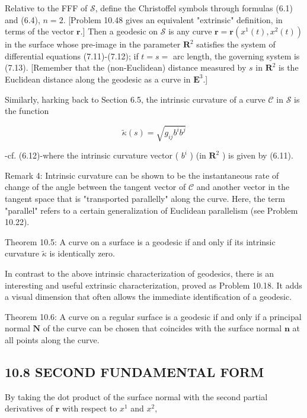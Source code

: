 \documentclass[10pt]{article}
\begin{document}
Relative to the FFF of $\mathscr{S}$, define the Christoffel symbols through formulas (6.1) and (6.4), $n=2$. [Problem 10.48 gives an equivalent "extrinsic" definition, in terms of the vector $\mathbf{r}$.] Then a geodesic on $\mathscr{S}$ is any curve $\mathbf{r}=\mathbf{r}\left(x^{1}(t), x^{2}(t)\right)$ in the surface whose pre-image in the parameter $\mathbf{R}^{2}$ satisfies the system of differential equations (7.11)-(7.12); if $t=s=$ arc length, the governing system is (7.13). [Remember that the (non-Euclidean) distance measured by $s$ in $\mathbf{R}^{2}$ is the Euclidean distance along the geodesic as a curve in $\mathbf{E}^{3}$.]

Similarly, harking back to Section 6.5, the intrinsic curvature of a curve $\mathscr{C}$ in $\mathscr{S}$ is the function


\begin{equation*}
\tilde{\kappa}(s)=\sqrt{g_{i j} b^{i} b^{j}} \tag{10.20}
\end{equation*}


-cf. (6.12)-where the intrinsic curvature vector ( $b^{i}$ ) (in $\mathbf{R}^{2}$ ) is given by (6.11).

Remark 4: Intrinsic curvature can be shown to be the instantaneous rate of change of the angle between the tangent vector of $\mathscr{C}$ and another vector in the tangent space that is "transported parallelly" along the curve. Here, the term "parallel" refers to a certain generalization of Euclidean parallelism (see Problem 10.22).

Theorem 10.5: A curve on a surface is a geodesic if and only if its intrinsic curvature $\tilde{\kappa}$ is identically zero.

In contrast to the above intrinsic characterization of geodesics, there is an interesting and useful extrinsic characterization, proved as Problem 10.18. It adds a visual dimension that often allows the immediate identification of a geodesic.

Theorem 10.6: A curve on a regular surface is a geodesic if and only if a principal normal $\mathbf{N}$ of the curve can be chosen that coincides with the surface normal $\mathbf{n}$ at all points along the curve.

\subsection*{10.8 SECOND FUNDAMENTAL FORM}
By taking the dot product of the surface normal with the second partial derivatives of $\mathbf{r}$ with respect to $x^{1}$ and $x^{2}$,
\end{document}
